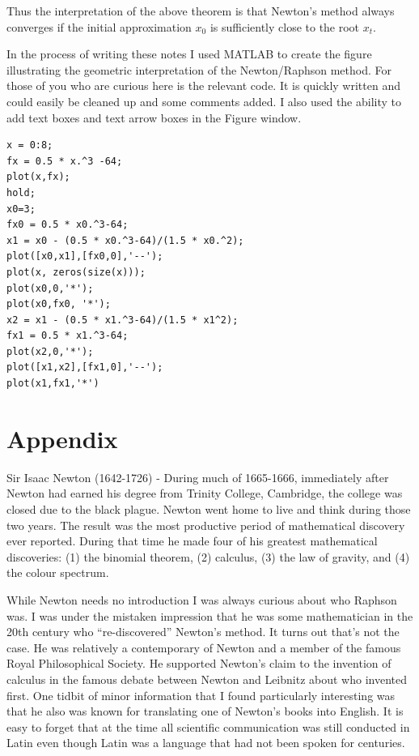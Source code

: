 \documentclass [titlepage,12pt,letter] {article}
\begin{document}
Thus the interpretation of the above theorem is that Newton's method always converges if the initial approximation $x_0$ is sufficiently close to the root $x_t$. 

In the process of writing these notes I used MATLAB to create the
figure illustrating the geometric interpretation of the Newton/Raphson
method. For those of you who are curious here is the relevant code. It
is quickly written and could easily be cleaned up and some comments
added. I also used the ability to add text boxes and text arrow boxes
in the Figure window.

\begin{verbatim} 
x = 0:8;
fx = 0.5 * x.^3 -64;
plot(x,fx);
hold;
x0=3;
fx0 = 0.5 * x0.^3-64;
x1 = x0 - (0.5 * x0.^3-64)/(1.5 * x0.^2);
plot([x0,x1],[fx0,0],'--');
plot(x, zeros(size(x)));
plot(x0,0,'*');
plot(x0,fx0, '*');
x2 = x1 - (0.5 * x1.^3-64)/(1.5 * x1^2);
fx1 = 0.5 * x1.^3-64;
plot(x2,0,'*');
plot([x1,x2],[fx1,0],'--');
plot(x1,fx1,'*')
\end{verbatim} 

\section*{Appendix} 

Sir Isaac Newton (1642-1726) - During much of 1665-1666, immediately after Newton had earned
his degree from Trinity College, Cambridge, the college was closed due to the black plague. Newton
went home to live and think during those two years. The result was the most productive period of
mathematical discovery ever reported. During that time he made four of his greatest mathematical
discoveries: (1) the binomial theorem, (2) calculus, (3) the law of gravity, and (4) the colour spectrum.

While Newton needs no introduction I was always curious about who
Raphson was. I was under the mistaken impression that he was some
mathematician in the 20th century who ``re-discovered'' Newton's
method. It turns out that's not the case. He was relatively a
contemporary of Newton and a member of the famous Royal Philosophical
Society. He supported Newton's claim to the invention of calculus in the
famous debate between Newton and Leibnitz about who invented
first. One tidbit of minor information that I found particularly
interesting was that he also was known for translating one of Newton's
books into English. It is easy to forget that at the time all
scientific communication was still conducted in Latin even though
Latin was a language that had not been spoken for centuries.






 
 
\end{document}
